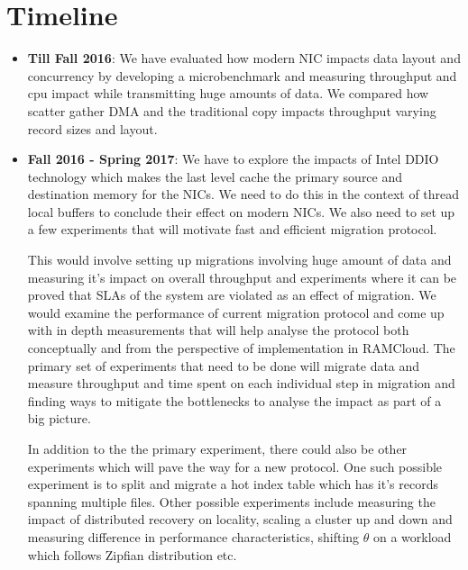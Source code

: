 \section{Timeline}




\begin{itemize}
\item{\textbf{Till Fall 2016}:} We have evaluated how modern NIC impacts data layout 
and concurrency by developing a microbenchmark and measuring throughput and cpu 
impact while transmitting huge amounts of data. We compared how scatter gather DMA 
and the traditional copy impacts throughput varying record sizes and layout. 

\item{\textbf{Fall 2016 - Spring 2017}:} We have to explore the impacts of Intel\textregistered 
DDIO~\cite{ddio} technology which makes the last level cache the primary source and 
destination memory for the NICs. We need to do this in the context of thread local 
buffers to conclude their effect on modern NICs. We also need to set up a few experiments
that will motivate fast and efficient migration protocol. 

This would involve  setting up migrations involving huge amount of data and measuring it's impact on overall throughput
and experiments where it can be proved that SLAs of the system are violated as an effect of migration.
We would examine the performance of current migration protocol and come up with in depth measurements
that will help analyse the protocol both conceptually and from the perspective of implementation in RAMCloud.
The primary set of experiments that need to be done will migrate data and measure throughput and time 
spent on each individual step in migration and finding ways to mitigate the bottlenecks to analyse
the impact as part of a big picture.

In addition to the the primary experiment, there could also be other experiments which will pave 
the way for a new protocol. One such possible experiment is to split and migrate a hot index table which has it's 
records spanning multiple files. Other possible experiments include measuring the 
impact of distributed recovery on locality, scaling a cluster up and down and measuring
difference in performance characteristics, shifting $\theta$ on a workload which follows 
Zipfian distribution etc.
\end{itemize}


%